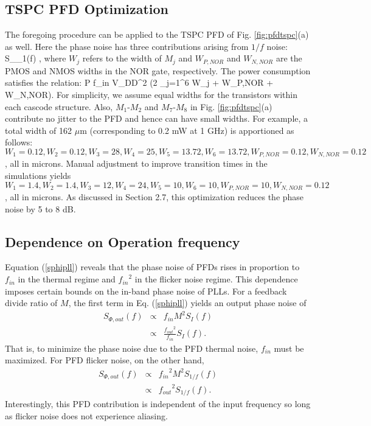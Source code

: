 \subsection{TSPC PFD Optimization}
The foregoing procedure can be applied to the TSPC PFD of Fig. \ref{fig:pfdtspc}(a) as well. Here the phase noise has three contributions arising from
$1/f$ noise:
\beq
S_{\Phi _1}(f) \propto {},
\label{sphit1}
\eeq
where $W_j$ refers to the width of $M_j$ and $W_{P,NOR}$ and $W_{N,NOR}$ are the PMOS and NMOS widths in the NOR gate, respectively. The
power consumption satisfies the relation:
\beq
P \propto f_{in} {V_{DD}}^2 (2 \sum_{j=1}^{6} W_j + W_{P,NOR}  + W_{N,NOR}).
\label{powert}
\eeq
For simplicity, we assume equal widths for the transistors within each cascode structure. Also, $M_1$-$M_2$ and $M_7$-$M_8$ in Fig.
\ref{fig:pfdtspc}(a) contribute no
jitter to the PFD and hence can have small widths. For example, a total width of 162 $\mu$m {(corresponding to
0.2 mW at 1 GHz)} is apportioned as follows:
$W_1 = 0.12, W_2 = 0.12, W_3 = 28,
 W_4 = 25, W_5 = 13.72, W_6 = 13.72, 
 W_{P,NOR} = 0.12, W_{N,NOR} = 0.12$,
all in microns. Manual adjustment to improve transition times in the simulations yields
$W_1 = 1.4, W_2 = 1.4, W_3 = 12, 
 W_4 = 24, W_5 = 10, W_6 = 10,
 W_{P,NOR} = 10, W_{N,NOR} = 0.12$, all in microns. As discussed in Section 2.7, this optimization reduces the phase noise by 5 to 8 dB.

\subsection{Dependence on Operation frequency}
Equation (\ref{sphipll}) reveals that the phase noise of PFDs rises in proportion to $f_{in}$ in the thermal regime and
${f_{in}}^2$ in the flicker noise regime. This dependence imposes certain bounds on the in-band phase noise of PLLs. For a feedback divide
ratio of $M$, the first term in Eq. (\ref{sphipll}) yields an output phase noise of
\begin{eqnarray}
S_{\Phi, out}(f) &\propto& f_{in} M^2 S_{I}(f) \nonumber \\ &\propto& \frac{{f_{out}}^2} {f_{in}} S_{I}(f).
\label{sphiwfreq}
\end{eqnarray}
That is, to minimize the phase noise due to the PFD thermal noise, $f_{in}$ must be maximized. For PFD flicker noise, on the other hand, 
\begin{eqnarray}
S_{\Phi, out}(f) &\propto& {f_{in}}^2 M^2 S_{1/f}(f) \nonumber \\ &\propto& {{f_{out}}^2} S_{1/f}(f).
\label{sphiffreq}
\end{eqnarray}
Interestingly, this PFD contribution is independent of the input frequency so long as flicker noise does not experience aliasing.




